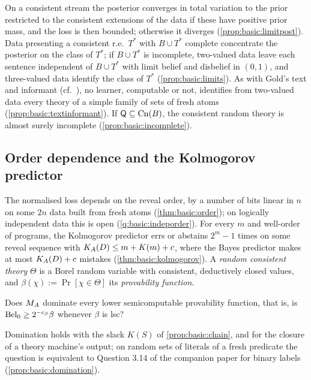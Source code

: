 On a consistent stream the posterior converges in total variation to the prior restricted to the consistent extensions of the data if these have positive prior mass, and the loss is then bounded; otherwise it diverges (\cref{prop:basic:limitpost}). Data presenting a consistent r.e.\ $T^*$ with $B\cup T^*$ complete concentrate the posterior on the class of $T^*$; if $B\cup T^*$ is incomplete, two-valued data leave each sentence independent of $B\cup T^*$ with limit belief and disbelief in $(0,1)$, and three-valued data identify the class of $T^*$ (\cref{prop:basic:limits}). As with Gold's text and informant (cf.\ \citealp{gold1967language}), no learner, computable or not, identifies from two-valued data every theory of a simple family of sets of fresh atoms (\cref{prop:basic:textinformant}). If $\mathsf{Q}\subseteq\mathrm{Cn}(B)$, the consistent random theory is almost surely incomplete (\cref{prop:basic:incomplete}).

\subsection{Order dependence and the Kolmogorov predictor}\label{sec:basic:order}

The normalised loss depends on the reveal order, by a number of bits linear in $n$ on some $2n$ data built from fresh atoms (\cref{thm:basic:order}); on logically independent data this is open (\cref{q:basic:indeporder}). For every $m$ and well-order of programs, the Kolmogorov predictor errs or abstains $2^m-1$ times on some reveal sequence with $K_{A}(D)\le m+K(m)+c$, where the Bayes predictor makes at most $K_{A}(D)+c$ mistakes (\cref{thm:basic:kolmogorov}). A \emph{random consistent theory} $\Theta$ is a Borel random variable with consistent, deductively closed values, and $\beta(\chi):=\Pr[\chi\in\Theta]$ its \emph{provability function}.

\begin{question}\label{q:basic:domination}
Does $M_{A}$ dominate every lower semicomputable provability function, that is, is $\mathrm{Bel}_0\ge2^{-c_\beta}\beta$ whenever $\beta$ is lsc?
\end{question}

Domination holds with the slack $K(S)$ of \cref{prop:basic:chain}, and for the closure of a theory machine's output; on random sets of literals of a fresh predicate the question is equivalent to Question 3.14 of the companion paper for binary labels (\cref{prop:basic:domination}).

